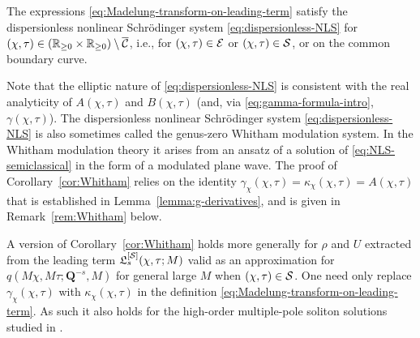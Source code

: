 \begin{corollary}
The expressions \eqref{eq:Madelung-transform-on-leading-term} satisfy the dispersionless nonlinear Schr\"odinger system \eqref{eq:dispersionless-NLS} for $(\chi,\tau)\in(\mathbb{R}_{\ge 0}\times\mathbb{R}_{\ge 0})\setminus\overline{\mathcal{C}}$, i.e., for $(\chi,\tau)\in\mathcal{E}$ or $(\chi,\tau)\in\mathcal{S}$, or on the common boundary curve.
\label{cor:Whitham}
\end{corollary}
Note that the elliptic nature of \eqref{eq:dispersionless-NLS} is consistent with the real analyticity of $A(\chi,\tau)$ and $B(\chi,\tau)$ (and, via \eqref{eq:gamma-formula-intro}, $\gamma(\chi,\tau)$).  The dispersionless nonlinear Schr\"odinger system \eqref{eq:dispersionless-NLS} is also sometimes called the genus-zero Whitham modulation system.  In the Whitham modulation theory it arises from an ansatz of a solution of \eqref{eq:NLS-semiclassical} in the form of a modulated plane wave.  The proof of Corollary~\ref{cor:Whitham} relies on the identity $\gamma_\chi(\chi,\tau)=\kappa_\chi(\chi,\tau)=A(\chi,\tau)$ that is established in Lemma~\ref{lemma:g-derivatives}, and is given in Remark~\ref{rem:Whitham} below.

\begin{remark}
A version of Corollary~\ref{cor:Whitham} holds more generally for $\rho$ and $U$ extracted from the leading term $\mathfrak{L}_s^{[\mathcal{S}]}(\chi,\tau;M)$ valid as an approximation for $q(M\chi,M\tau;\mathbf{Q}^{-s},M)$ for general large $M$ when $(\chi,\tau)\in\mathcal{S}$.  One need only replace $\gamma_\chi(\chi,\tau)$ with $\kappa_\chi(\chi,\tau)$ in the definition \eqref{eq:Madelung-transform-on-leading-term}.  As such it also holds for the high-order multiple-pole soliton solutions studied in \cite{BilmanBW19}.
\end{remark}

